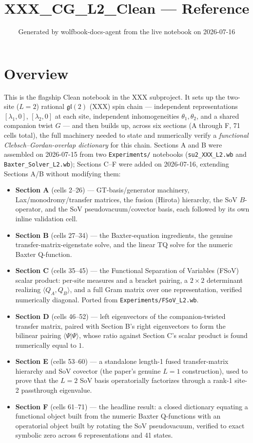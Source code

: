 \documentclass[11pt]{article}
\title{XXX\_CG\_L2\_Clean --- Reference}
\author{}
\date{Generated by wolfbook-docs-agent from the live notebook on 2026-07-16}
\begin{document}
\maketitle

\section*{Overview}

This is the flagship Clean notebook in the XXX subproject. It sets up the two-site ($L=2$) rational
$\mathfrak{gl}(2)$ (XXX) spin chain --- independent representations $[\lambda_1,0]$, $[\lambda_2,0]$
at each site, independent inhomogeneities $\theta_1,\theta_2$, and a shared companion twist $G$ ---
and then builds up, across six sections (A through F, 71 cells total), the full machinery needed to
state and numerically verify a \emph{functional Clebsch--Gordan-overlap dictionary} for this chain.
Sections A and B were assembled on 2026-07-15 from two \texttt{Experiments/} notebooks
(\texttt{su2\_XXX\_L2.wb} and \texttt{Baxter\_Solver\_L2.wb}); Sections C--F were added on
2026-07-16, extending Sections A/B without modifying them:

\begin{itemize}
\item \textbf{Section A} (cells 2--26) --- GT-basis/generator machinery, Lax/monodromy/transfer
  matrices, the fusion (Hirota) hierarchy, the SoV $B$-operator, and the SoV pseudovacuum/covector
  basis, each followed by its own inline validation cell.
\item \textbf{Section B} (cells 27--34) --- the Baxter-equation ingredients, the genuine
  transfer-matrix-eigenstate solve, and the linear TQ solve for the numeric Baxter Q-function.
\item \textbf{Section C} (cells 35--45) --- the Functional Separation of Variables (FSoV) scalar
  product: per-site measures and a bracket pairing, a $2\times2$ determinant realizing
  $\langle Q_A,Q_B\rangle$, and a full Gram matrix over one representation, verified numerically
  diagonal. Ported from \texttt{Experiments/FSoV\_L2.wb}.
\item \textbf{Section D} (cells 46--52) --- left eigenvectors of the companion-twisted transfer
  matrix, paired with Section B's right eigenvectors to form the bilinear pairing
  $\langle\Psi|\Psi\rangle$, whose ratio against Section C's scalar product is found numerically
  equal to $1$.
\item \textbf{Section E} (cells 53--60) --- a standalone length-1 fused transfer-matrix hierarchy
  and SoV covector (the paper's genuine $L=1$ construction), used to prove that the $L=2$ SoV basis
  operatorially factorizes through a rank-1 site-2 passthrough eigenvalue.
\item \textbf{Section F} (cells 61--71) --- the headline result: a closed dictionary equating a
  functional object built from the numeric Baxter Q-functions with an operatorial object built by
  rotating the SoV pseudovacuum, verified to exact symbolic zero across 6 representations and 41
  states.
\end{itemize}
\end{document}
